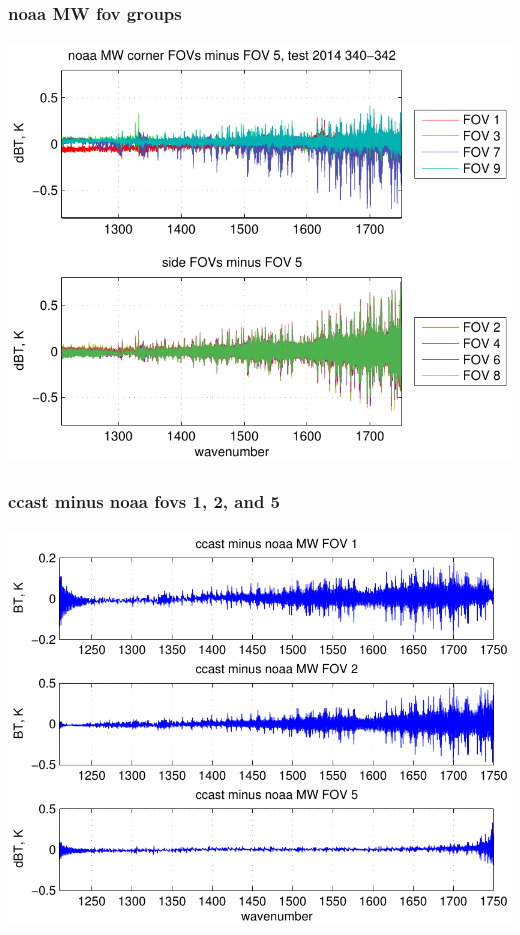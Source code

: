 \documentclass[11pt]{beamer}
\begin{document}
\begin{frame}
\frametitle{noaa MW fov groups}

\begin{center}
  \includegraphics[scale=0.7]{figures/noaa_MW_dif_2014_340-342.pdf}
\end{center}

\end{frame}
\begin{frame}
\frametitle{ccast minus noaa fovs 1, 2, and 5}

\begin{center}
  \includegraphics[scale=0.7]{figures/ccast_noaa_MW_fig_1.pdf}
\end{center}

\end{frame}
\end{document}
